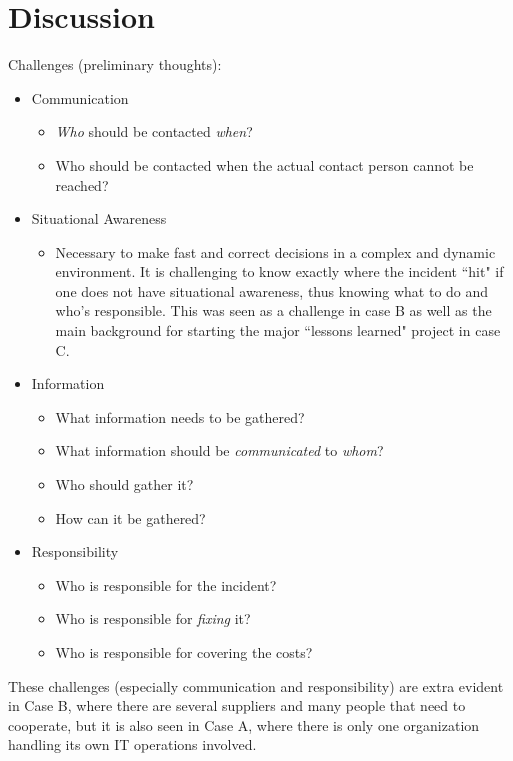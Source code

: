 \chapter{Discussion}

Challenges (preliminary thoughts):
\begin{itemize}
\item Communication
\begin{itemize}
\item \textit{Who} should be contacted \textit{when}?
\item Who should be contacted when the actual contact person cannot be reached?
\end{itemize}
\item Situational Awareness
\begin{itemize}
\item Necessary to make fast and correct decisions in a complex and dynamic environment. It is challenging to know exactly where the incident ``hit" if one does not have situational awareness, thus knowing what to do and who's responsible. This was  seen as a challenge in case B as well as the main background for starting the major ``lessons learned" project in case C.
\end{itemize}
\item Information
\begin{itemize}
\item What information needs to be gathered?
\item What information should be \textit{communicated} to \textit{whom}?
\item Who should gather it?
\item How can it be gathered?
\end{itemize}
\item Responsibility
\begin{itemize}
\item Who is responsible for the incident?
\item Who is responsible for \textit{fixing} it?
\item Who is responsible for covering the costs?
\end{itemize}
\end{itemize}

These challenges (especially communication and responsibility) are extra evident in Case B, where there are several suppliers and many people that need to cooperate, but it is also seen in Case A, where there is only one organization handling its own IT operations involved.

